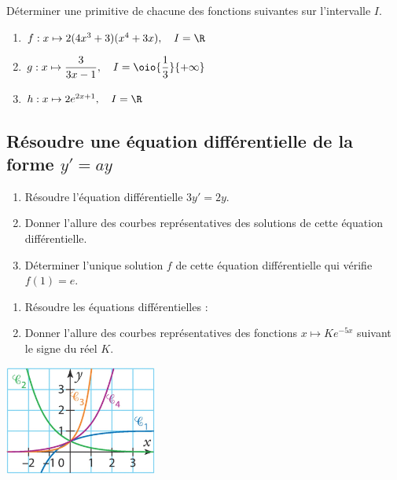 \documentclass[a4paper,11pt,exos]{nsi} %
\begin{document}
\exo{}
Déterminer une primitive de chacune des fonctions suivantes sur l'intervalle $I$.
\begin{enumerate}
    \item $f:x\mapsto 2(4x^3+3)(x^4+3x), \quad I=\R$
    \item $g:x\mapsto \dfrac{3}{3x-1}, \quad I=\oio{\dfrac{1}{3}}{+\infty}$
    \item $h:x\mapsto 2e^{2x+1}, \quad I=\R$
\end{enumerate}

\subsection*{Résoudre une équation différentielle de la forme $y'=ay$}
\exo{}
\begin{enumerate}
    \item Résoudre l'équation différentielle $3y'=2y$.
    \item Donner l'allure des courbes représentatives des solutions de cette équation différentielle.
    \item Déterminer l'unique solution $f$ de cette équation différentielle qui vérifie $f(1)=e$.
\end{enumerate}

\exo{}
\begin{enumerate}
    \item Résoudre les équations différentielles :
    \begin{multicols}{2}
    \end{multicols}
    \item Donner l'allure des courbes représentatives des fonctions $x\mapsto K e^{-5x}$ suivant le signe du réel $K$.
\end{enumerate}

{\includegraphics[width=5cm]{courbes1.jpg}}
\end{document}
